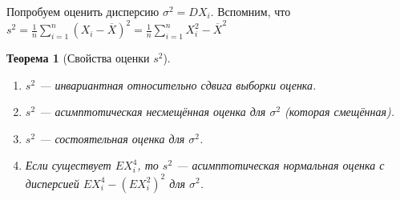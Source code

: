 \documentclass[11pt,openany,a4paper]{scrartcl}
\theoremstyle{plain}
\newtheorem{theorem}{Теорема}[subsection]
\theoremstyle{definition}
\newcommand{\ol}{\overline}
\begin{document}
Попробуем оценить дисперсию $\sigma^2 = DX_i$.
Вспомним, что $s^2 = \frac{1}{n} \sum\limits_{i=1}^n (X_i - \ol X)^2 =
\frac{1}{n}\sum\limits_{i=1}^n X_i^2 - \ol X^2$

\begin{theorem}[Свойства оценки $s^2$]
\mbox{}
    \begin{enumerate}
        \item $s^2$ — инвариантная относительно сдвига выборки оценка.
        \item $s^2$ — асимптотическая несмещённая оценка для $\sigma^2$ (которая смещённая).
        \item $s^2$ — состоятельная оценка для $\sigma^2$.
        \item Если существует $EX_i^4$, то $s^2$ — асимптотическая нормальная оценка с 
        дисперсией $EX_i^4 - (EX_i^2)^2$ для $\sigma^2$.
    \end{enumerate}
\end{theorem}
\end{document}
